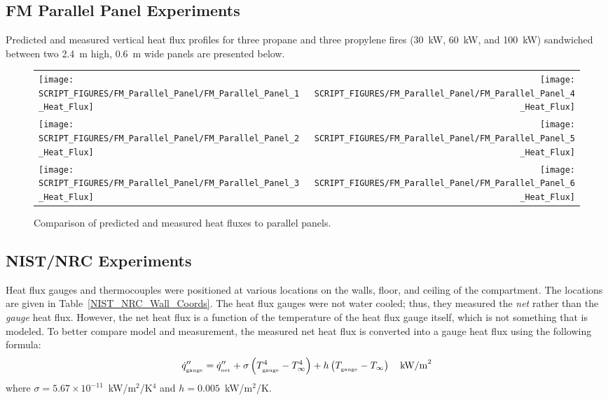 \clearpage


\subsection{FM Parallel Panel Experiments}

Predicted and measured vertical heat flux profiles for three propane and three propylene fires (30~kW, 60~kW, and 100~kW) sandwiched between two 2.4~m high, 0.6~m wide panels are presented below.

\begin{figure}[h!]
\begin{tabular*}{\textwidth}{l@{\extracolsep{\fill}}r}
\texttt{[image: SCRIPT\_FIGURES/FM\_Parallel\_Panel/FM\_Parallel\_Panel\_1\_Heat\_Flux]} &
\texttt{[image: SCRIPT\_FIGURES/FM\_Parallel\_Panel/FM\_Parallel\_Panel\_4\_Heat\_Flux]} \\
\texttt{[image: SCRIPT\_FIGURES/FM\_Parallel\_Panel/FM\_Parallel\_Panel\_2\_Heat\_Flux]} &
\texttt{[image: SCRIPT\_FIGURES/FM\_Parallel\_Panel/FM\_Parallel\_Panel\_5\_Heat\_Flux]} \\
\texttt{[image: SCRIPT\_FIGURES/FM\_Parallel\_Panel/FM\_Parallel\_Panel\_3\_Heat\_Flux]} &
\texttt{[image: SCRIPT\_FIGURES/FM\_Parallel\_Panel/FM\_Parallel\_Panel\_6\_Heat\_Flux]}
\end{tabular*}
\label{FM_Parallel_Panel}
\caption[Side wall heat flux predictions, FM Parallel Panel experiments]
{Comparison of predicted and measured heat fluxes to parallel panels.}
\end{figure}


\clearpage

\subsection{NIST/NRC Experiments}

Heat flux gauges and thermocouples were positioned at various locations on the walls, floor, and ceiling of the compartment. The locations are given in Table~\ref{NIST_NRC_Wall_Coords}. The heat flux gauges were not water cooled; thus, they measured the {\em net} rather than the {\em gauge} heat flux. However, the net heat flux is a function of the temperature of the heat flux gauge itself, which is not something that is modeled. To better compare model and measurement, the measured net heat flux is converted into a gauge heat flux using the following formula:
\begin{equation}
\dot{q}''_{_{\textrm{\tiny gauge}}} = \dot{q}''_{_{\textrm{\tiny net}}} + \sigma \left( T^4_{_{\textrm{\tiny gauge}}} - T^4_\infty \right) + h  \left( T_{_{\textrm{\tiny gauge}}}-T_\infty \right) \quad \hbox{kW/m}^2
\end{equation}
where $\sigma=5.67 \times 10^{-11}$~kW/m$^2$/K$^4$ and $h=0.005$~kW/m$^2$/K.


